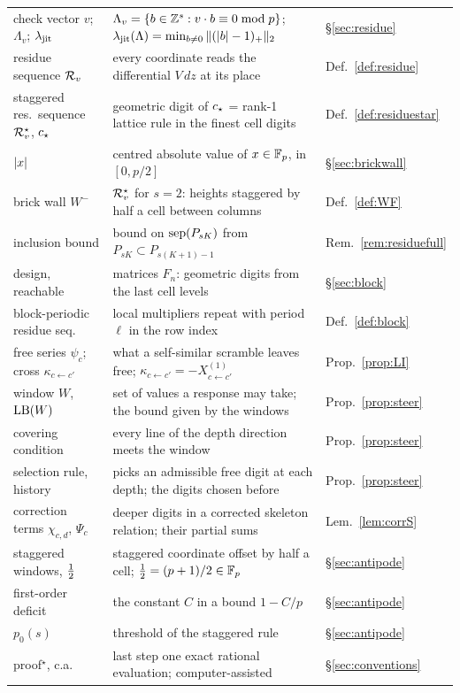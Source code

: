 \begin{table}[!tp]
\begin{tabular}{@{}>{\raggedright\arraybackslash}p{}>{\raggedright\arraybackslash}p{}l@{}}
check vector $v$; $\Lambda_v$; $\lambda_{\mathrm{jit}}$ & $\Lambda_v=\{b\in\mathbb{Z}^s:v\cdot b\equiv0\bmod p\}$; $\lambda_{\mathrm{jit}}(\Lambda)=\min_{b\ne0}\|(|b|-1)_+\|_2$ & \S\ref{sec:residue}\\
residue sequence $\mathcal{R}_v$ & every coordinate reads the differential $V\,dz$ at its place & Def.~\ref{def:residue}\\
staggered res.\ sequence $\mathcal{R}^{\star}_v$, $c_{\star}$ & geometric digit of $c_{\star}$ = rank-1 lattice rule in the finest cell digits & Def.~\ref{def:residuestar}\\
$\lvert x\rvert$ & centred absolute value of $x\in\mathbb{F}_p$, in $[0,p/2]$ & \S\ref{sec:brickwall}\\
brick wall $W^-$ & $\mathcal{R}^{\star}_v$ for $s=2$: heights staggered by half a cell between columns & Def.~\ref{def:WF}\\
inclusion bound & bound on $\operatorname{sep}(P_{sK})$ from $P_{sK}\subset P_{s(K+1)-1}$ & Rem.~\ref{rem:residuefull}\\
design, reachable & matrices $F_n$: geometric digits from the last cell levels \cite{Gru26geo} & \S\ref{sec:block}\\
block-periodic residue seq.\ & local multipliers repeat with period $\ell$ in the row index & Def.~\ref{def:block}\\
free series $\psi_c$; cross $\kappa_{c\leftarrow c'}$ & what a self-similar scramble leaves free; $\kappa_{c\leftarrow c'}=-X^{(1)}_{c\leftarrow c'}$ & Prop.~\ref{prop:LI}\\
window $W$, $\mathrm{LB}(W)$ & set of values a response may take; the bound given by the windows & Prop.~\ref{prop:steer}\\
covering condition & every line of the depth direction meets the window & Prop.~\ref{prop:steer}\\
selection rule, history & picks an admissible free digit at each depth; the digits chosen before & Prop.~\ref{prop:steer}\\
correction terms $\chi_{c,d}$, $\Psi_c$ & deeper digits in a corrected skeleton relation; their partial sums & Lem.~\ref{lem:corrS}\\
staggered windows, $\tfrac12$ & staggered coordinate offset by half a cell; $\tfrac12=(p+1)/2\in\mathbb{F}_p$ & \S\ref{sec:antipode}\\
first-order deficit & the constant $C$ in a bound $1-C/p$ \cite{Gru26geo} & \S\ref{sec:antipode}\\
$p_0(s)$ & threshold of the staggered rule & \S\ref{sec:antipode}\\
proof${}^\star$, c.a. & last step one exact rational evaluation; computer-assisted & \S\ref{sec:conventions}\\
\bottomrule
\end{tabular}
\end{table}
